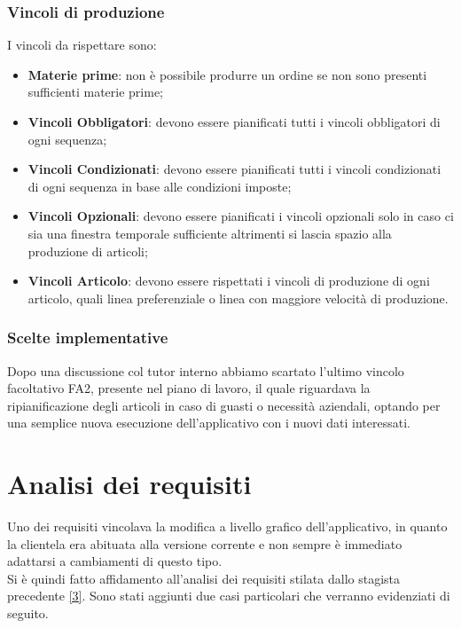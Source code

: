 \subsubsection{Vincoli di produzione}
I vincoli da rispettare sono:
\begin{itemize}
	
	\item \textbf{Materie prime}: non è possibile produrre un ordine se non sono presenti sufficienti materie prime;
	
	\item \textbf{Vincoli Obbligatori}: devono essere pianificati tutti i vincoli obbligatori di ogni sequenza;
	\item \textbf{Vincoli Condizionati}: devono essere pianificati tutti i vincoli condizionati di ogni sequenza in base alle condizioni imposte;
\item \textbf{Vincoli Opzionali}: devono essere pianificati i vincoli opzionali solo in caso ci sia una finestra temporale sufficiente altrimenti si lascia spazio alla produzione di articoli;
	\item \textbf{Vincoli Articolo}: devono essere rispettati i vincoli di produzione di ogni articolo, quali linea preferenziale o linea con maggiore velocità di produzione.
\end{itemize}

\subsubsection{Scelte implementative}
Dopo una discussione col tutor interno abbiamo scartato l'ultimo vincolo facoltativo FA2, presente nel piano di lavoro, il quale riguardava la ripianificazione
degli articoli in caso di guasti o necessità aziendali, optando per una semplice nuova esecuzione dell'applicativo con i nuovi dati interessati. 



\section{Analisi dei requisiti}

Uno dei requisiti vincolava la modifica a livello grafico dell'applicativo, in quanto la clientela era abituata alla versione corrente e non sempre
è immediato adattarsi a cambiamenti di questo tipo.\\ 
Si è quindi fatto affidamento all'analisi dei requisiti stilata dallo stagista precedente \hyperref[analisi-requisiti]{[3]}.
Sono stati aggiunti due casi particolari che verranno evidenziati di seguito.

